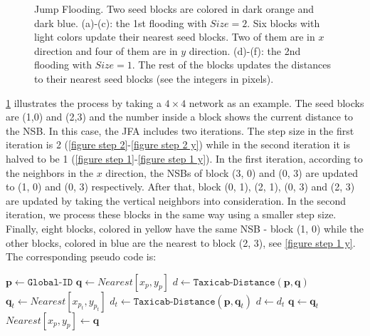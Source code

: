 \begin{figure}
{    }
\caption{Jump Flooding. Two seed blocks are colored in dark orange and dark blue.
(a)-(c): the 1st flooding with $Size = 2$. Six blocks with light colors update their nearest seed blocks. Two of them are in $x$ direction and four of them are in $y$ direction.
(d)-(f): the 2nd flooding with $Size = 1$. The rest of the blocks updates the distances to their nearest seed blocks (see the integers in pixels).
}
\label{figure jump flooding}
\end{figure}

\figurename \ref{figure jump flooding} illustrates the process by taking a $4 \times 4$ network as an example.
The seed blocks are (1,0) and (2,3) and the number inside a block shows the current distance to the NSB.
In this case, the JFA includes two iterations.
The step size in the first iteration is 2 (\figurename \ref{figure step 2}-\ref{figure step 2 y}) while in the second iteration it is halved to be 1 (\figurename \ref{figure step 1}-\ref{figure step 1 y}).
In the first iteration, according to the neighbors in the $x$ direction, the NSBs of block (3, 0) and (0, 3) are updated to (1, 0) and (0, 3) respectively.
After that, block (0, 1), (2, 1), (0, 3) and (2, 3) are updated by taking the vertical neighbors into consideration.
In the second iteration, we process these blocks in the same way using a smaller step size.
Finally, eight blocks, colored in yellow have the same NSB - block (1, 0) while the other blocks, colored in blue are the nearest to block (2, 3), see \figurename \ref{figure step 1 y}.
The corresponding pseudo code is:

\begin{algorithm}
\label{algorithm jump flooding}
\caption{$\texttt{Jump Flooding}(Size, Nearest)$}
\begin{algorithmic}
\STATE $\mathbf{p} \leftarrow \texttt{Global-ID}$
\STATE $\mathbf{q} \leftarrow Nearest[x_p, y_p]$
\STATE $d \leftarrow \texttt{Taxicab-Distance} (\mathbf{p}, \mathbf{q})$
    \STATE $\mathbf{q}_t \leftarrow Nearest[x_{p_t}, y_{p_t}]$
    \STATE $d_t \leftarrow \texttt{Taxicab-Distance} (\mathbf{p}, \mathbf{q}_t)$
        \STATE $d \leftarrow d_t$
        \STATE $\mathbf{q} \leftarrow \mathbf{q}_t$
    \ENDIF
\ENDFOR
\STATE $Nearest[x_p, y_p] \leftarrow \mathbf{q}$
\end{algorithmic}
\end{algorithm}

